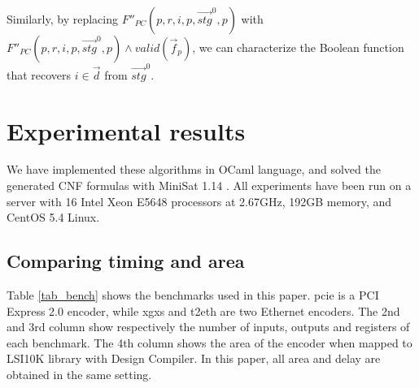 \documentclass[conference]{IEEEtran}
\begin{document}
Similarly,
by replacing $F''_{PC}(p,r,i,p,\vec{stg}^0,p)$ with $F''_{PC}(p,r,i,p,\vec{stg}^0,p)\wedge valid(\vec{f}_p)$,
we can characterize the Boolean function that recovers $i\in\vec{d}$ from $\vec{stg}^0$.



\section{Experimental results}\label{sec_exp}
We have implemented these algorithms in OCaml language,
and solved the generated CNF formulas with MiniSat 1.14 \cite{EXTSAT}.
All experiments have been run on a server with 16 Intel Xeon E5648 processors at 2.67GHz, 
192GB memory, and CentOS 5.4 Linux.


\subsection{Comparing timing and area}
Table \ref{tab_bench} shows the benchmarks used in this paper.
pcie is a PCI Express 2.0 \cite{pcie} encoder,
while xgxs and t2eth are two Ethernet \cite{IEEE8023_S4} encoders.
The 2nd and 3rd column show respectively the number of inputs, outputs and registers of each benchmark.
The 4th column shows the area of the encoder when mapped to LSI10K library with Design Compiler.
In this paper, 
all area and delay are obtained in the same setting.
\end{document}
